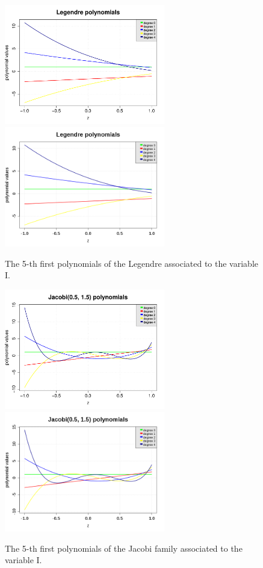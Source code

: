 \documentclass[11pt]{article}
\begin{document}
\begin{figure}[Hhbtp]
  \begin{minipage}{9cm}
    \begin{center}
      \ifpdf
      \includegraphics[width=7cm]{PCE_LegendrePolynomials_VariableL.pdf}
      \else
      \includegraphics[width=7cm]{PCE_LegendrePolynomials_VariableL.png}
      \fi
      \caption{The 5-th first polynomials of the Legendre associated to the variable I.}
      \label{PCE_L}
    \end{center}
  \end{minipage}
  \hfill
  \begin{minipage}{9cm}
    \begin{center}
      \ifpdf
      \includegraphics[width=7cm]{PCE_JacobiPolynomials_VariableI.pdf}
      \else
      \includegraphics[width=7cm]{PCE_JacobiPolynomials_VariableI.png}
      \fi
      \caption{The 5-th first polynomials of the Jacobi family associated to the variable I.}
      \label{PCE_I}
    \end{center}
  \end{minipage}
\end{figure}
\end{document}
